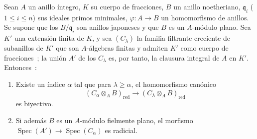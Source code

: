 \begin{proposition}[23.2.4]
\label{0.23.2.4-fr}
Sean $A$ un anillo íntegro, $K$ su cuerpo de fracciones, $B$ un anillo
noetheriano, $\mathfrak q_i$ ($1\leqslant i\leqslant n$) sus ideales primos
minimales, $\varphi:A\to B$ un homomorfismo de anillos. Se supone que los
$B/\mathfrak q_i$ son anillos japoneses y que $B$ es un $A$-módulo
plano. Sea $K'$ una extensión finita de $K$, y sea $(C_\lambda)$ la familia
filtrante creciente de subanillos de $K'$ que son $A$-álgebras
finitas y admiten $K'$ como cuerpo de fracciones~; la unión $A'$ de los
$C_\lambda$ es, por tanto, la clausura integral de $A$ en $K'$. Entonces~:
\begin{enumerate}
  \item[\textup{(i)}] Existe un índice $\alpha$ tal que para $\lambda\geqslant
  \alpha$, el homomorfismo canónico
  \begin{equation}
  \label{0.23.2.4.1-fr}
    (C_\alpha\otimes_AB)_{\mathrm{red}}
    \longrightarrow(C_\lambda\otimes_AB)_{\mathrm{red}}
    \tag{23.2.4.1}
  \end{equation}
  es biyectivo.
  \item[\textup{(ii)}] Si además $B$ es un $A$-módulo fielmente plano, el morfismo
  $\operatorname{Spec}(A')\to\operatorname{Spec}(C_\alpha)$ es radicial.
\end{enumerate}
\end{proposition}


